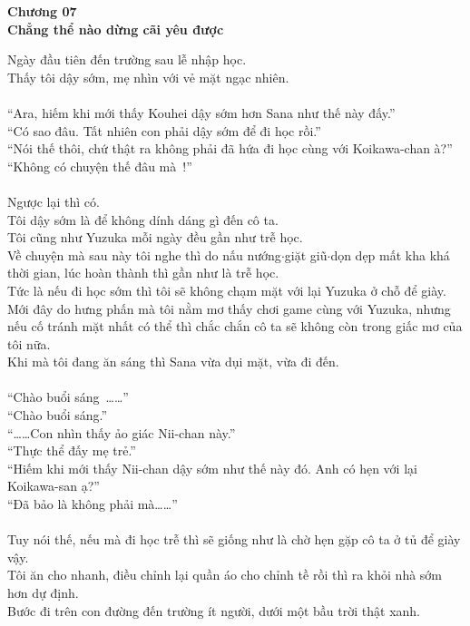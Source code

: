 \documentclass[12pt,a4paper, twosides]{book}
\begin{document}
    \begin{center}
    \textbf{\large Chương 07 \\ Chẳng thể nào dừng cãi yêu được}
    \end{center}
    \noindent
Ngày đầu tiên đến trường sau lễ nhập học.\\
Thấy tôi dậy sớm, mẹ nhìn với vẻ mặt ngạc nhiên.\\
\\
“Ara, hiếm khi mới thấy Kouhei dậy sớm hơn Sana như thế này đấy.”\\
“Có sao đâu. Tất nhiên con phải dậy sớm để đi học rồi.”\\
“Nói thế thôi, chứ thật ra không phải đã hứa đi học cùng với Koikawa-chan à?”\\
“Không có chuyện thế đâu mà~!”\\
\\
Ngược lại thì có.\\
Tôi dậy sớm là để không dính dáng gì đến cô ta.\\
Tôi cũng như Yuzuka mỗi ngày đều gần như trễ học.\\
Về chuyện mà sau này tôi nghe thì do nấu nướng$\cdot$giặt giũ$\cdot$dọn dẹp mất kha khá thời gian, lúc hoàn thành thì gần như là trễ học.\\
Tức là nếu đi học sớm thì tôi sẽ không chạm mặt với lại Yuzuka ở chỗ để giày.\\
Mới đây do hưng phấn mà tôi nằm mơ thấy chơi game cùng với Yuzuka, nhưng nếu cố tránh mặt nhất có thể thì chắc chắn cô ta sẽ không còn trong giấc mơ của tôi nữa.\\
Khi mà tôi đang ăn sáng thì Sana vừa dụi mặt, vừa đi đến.\\
\\
“Chào buổi sáng~……”\\
“Chào buổi sáng.”\\
“……Con nhìn thấy ảo giác Nii-chan này.”\\
“Thực thể đấy mẹ trẻ.”\\
“Hiếm khi mới thấy Nii-chan dậy sớm như thế này đó. Anh có hẹn với lại Koikawa-san ạ?”\\
“Đã bảo là không phải mà……”\\
\\
Tuy nói thế, nếu mà đi học trễ thì sẽ giống như là chờ hẹn gặp cô ta ở tủ để giày vậy.\\
Tôi ăn cho nhanh, điều chỉnh lại quần áo cho chỉnh tề rồi thì ra khỏi nhà sớm hơn dự định.\\
Bước đi trên con đường đến trường ít người, dưới một bầu trời thật xanh.\\
\end{document}
